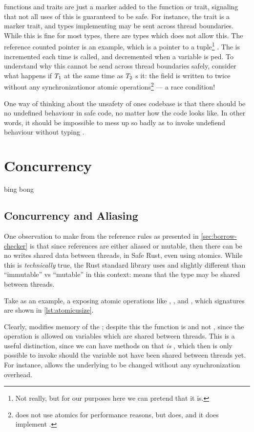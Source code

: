  functions and traits are just a marker added to the function or trait, signaling that
not all uses of this is guaranteed to be safe. For instance, the trait  is a marker
trait, and types implementing  may be sent across thread boundaries. While this is fine
for most types, there are types which does not allow this. The reference counted pointer
 is an example, which is a pointer to a tuple\footnote{Not really, but for our purposes
here we can pretend that it is.} . The  is incremented each time
 is called, and decremented when a variable is ped.  To understand why
this cannot be send across thread boundaries safely, consider what happens if $T\sb{1}$
 at the same time as $T\sb{2}$ s it: the  field is written to
twice without any synchronizationor atomic operations\footnote{ does not use atomics for
performance reasons, but  does, and it does implement .} --- a race condition!

One way of thinking about the unsafety of ones codebase is that there should be no undefined
behaviour in safe code, no matter how the code looks like. In other words, it should be impossible
to mess up so badly as to invoke undefiend behaviour without typing .



\section{Concurrency}

bing bong

\subsection{Concurrency and Aliasing\label{sec:concurrency-and-aliasing}}

One observation to make from the reference rules as presented in \cref{sec:borrow-checker} is that
since references are either aliased or mutable, then there can be no writes shared data between
threads, in Safe Rust, even using atomics. While this is \emph{technically} true, the Rust standard
library uses  and  slightly different than ``immutable'' vs ``mutable'' in
this context:  means that the type may be shared between threads.

Take  as an example, a  exposing atomic operations like ,
, and , which signatures are shown in \cref{lst:atomicusize}.

Clearly,  modifies memory of the ; despite this the function
is  and not , since the operation is allowed on variables which are
shared between threads.
This is a useful distinction, since we can have methods on  that \emph{is}
, which then is only possible to invoke should the variable not have been shared
between threads yet. For instance,  allows
the underlying  to be changed without any synchronization overhead.

